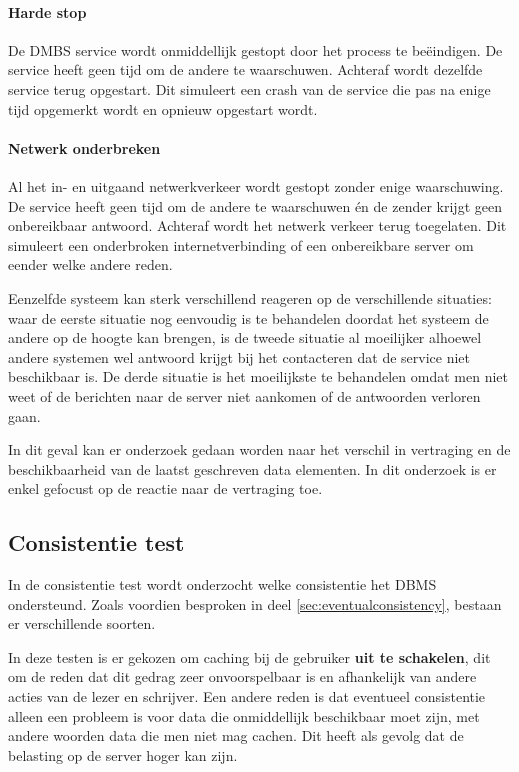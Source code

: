 \paragraph{Harde stop} De DMBS service wordt onmiddellijk gestopt door het process te beëindigen. De service heeft geen tijd om de andere te waarschuwen. Achteraf wordt dezelfde service terug opgestart. Dit simuleert een crash van de service die pas na enige tijd opgemerkt wordt en opnieuw opgestart wordt. 

\paragraph{Netwerk onderbreken} Al het in- en uitgaand netwerkverkeer wordt gestopt zonder enige waarschuwing. De service heeft geen tijd om de andere te waarschuwen én de zender krijgt geen onbereikbaar antwoord. Achteraf wordt het netwerk verkeer terug toegelaten. Dit simuleert een onderbroken internetverbinding of een onbereikbare server om eender welke andere reden.  

Eenzelfde systeem kan sterk verschillend reageren op de verschillende situaties: waar de eerste situatie nog eenvoudig is te behandelen doordat het systeem de andere op de hoogte kan brengen, is de tweede situatie al moeilijker alhoewel andere systemen wel antwoord krijgt bij het contacteren dat de service niet beschikbaar is. De derde situatie is het moeilijkste te behandelen omdat men niet weet of de berichten naar de server niet aankomen of de antwoorden verloren gaan. 

In dit geval kan er onderzoek gedaan worden naar het verschil in vertraging en de beschikbaarheid van de laatst geschreven data elementen. In dit onderzoek is er enkel gefocust op de reactie naar de vertraging toe. 
 
\subsection{Consistentie test}
In de consistentie test wordt onderzocht welke consistentie het DBMS ondersteund. Zoals voordien besproken in deel \ref{sec:eventualconsistency}, bestaan er verschillende soorten. 

In deze testen is er gekozen om caching bij de gebruiker \textbf{uit te schakelen}, dit om de reden dat dit gedrag zeer onvoorspelbaar is en afhankelijk van andere acties van de lezer en schrijver. Een andere reden is dat eventueel consistentie alleen een probleem is voor data die onmiddellijk beschikbaar moet zijn, met andere woorden data die men niet mag cachen. Dit heeft als gevolg dat de belasting op de server hoger kan zijn. 

